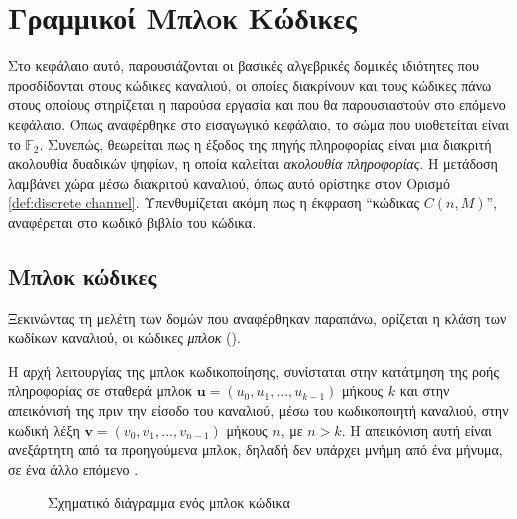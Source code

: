 \chapter{Γραμμικοί Μπλoκ Κώδικες}
Στο κεφάλαιο αυτό, παρουσιάζονται οι βασικές αλγεβρικές δομικές ιδιότητες που προσδίδονται στους κώδικες καναλιού, οι οποίες διακρίνουν και τους κώδικες πάνω στους οποίους στηρίζεται η παρούσα εργασία και που θα παρουσιαστούν στο επόμενο κεφάλαιο. Όπως αναφέρθηκε στο εισαγωγικό κεφάλαιο, το σώμα που υιοθετείται είναι το $\mathbb{F}_2$. Συνεπώς, θεωρείται πως η έξοδος της πηγής πληροφορίας είναι μια διακριτή ακολουθία  δυαδικών ψηφίων, η οποία καλείται \textit{ακολουθία πληροφορίας}. Η μετάδοση λαμβάνει χώρα μέσω διακριτού καναλιού, όπως αυτό ορίστηκε στον Ορισμό \ref{def:discrete channel}. Υπενθυμίζεται ακόμη πως η έκφραση \enquote{κώδικας $C(n,M)$}, αναφέρεται στο κωδικό βιβλίο του κώδικα.

\section{Μπλοκ κώδικες}
Ξεκινώντας τη μελέτη των δομών που αναφέρθηκαν παραπάνω, ορίζεται η κλάση των κωδίκων καναλιού, οι κώδικες \textit{μπλοκ} ().

Η αρχή λειτουργίας της μπλοκ κωδικοποίησης, συνίσταται στην κατάτμηση της ροής πληροφορίας σε σταθερά μπλοκ $\mathbf{u} = (u_0, u_1, ..., u_{k-1})$ μήκους $k$ και στην απεικόνισή της πριν την είσοδο του καναλιού, μέσω του κωδικοποιητή καναλιού, στην κωδική λέξη $\mathbf{v} = (v_0, v_1, ..., v_{n-1})$ μήκους $n$, με $n>k$. H απεικόνιση αυτή είναι ανεξάρτητη από τα προηγούμενα μπλοκ, δηλαδή δεν υπάρχει μνήμη από ένα μήνυμα, σε ένα άλλο επόμενο \cite{proakis1994communication}.

\begin{figure}[h]
\caption{Σχηματικό διάγραμμα ενός μπλοκ κώδικα}
\label{fig:linear block codes}
\end{figure}

